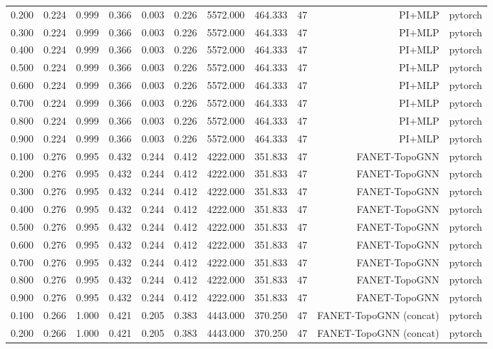 \begin{tabular}{lrrrrrrrrrr}
0.200 & 0.224 & 0.999 & 0.366 & 0.003 & 0.226 & 5572.000 & 464.333 & 47 & PI+MLP & pytorch \\
0.300 & 0.224 & 0.999 & 0.366 & 0.003 & 0.226 & 5572.000 & 464.333 & 47 & PI+MLP & pytorch \\
0.400 & 0.224 & 0.999 & 0.366 & 0.003 & 0.226 & 5572.000 & 464.333 & 47 & PI+MLP & pytorch \\
0.500 & 0.224 & 0.999 & 0.366 & 0.003 & 0.226 & 5572.000 & 464.333 & 47 & PI+MLP & pytorch \\
0.600 & 0.224 & 0.999 & 0.366 & 0.003 & 0.226 & 5572.000 & 464.333 & 47 & PI+MLP & pytorch \\
0.700 & 0.224 & 0.999 & 0.366 & 0.003 & 0.226 & 5572.000 & 464.333 & 47 & PI+MLP & pytorch \\
0.800 & 0.224 & 0.999 & 0.366 & 0.003 & 0.226 & 5572.000 & 464.333 & 47 & PI+MLP & pytorch \\
0.900 & 0.224 & 0.999 & 0.366 & 0.003 & 0.226 & 5572.000 & 464.333 & 47 & PI+MLP & pytorch \\
0.100 & 0.276 & 0.995 & 0.432 & 0.244 & 0.412 & 4222.000 & 351.833 & 47 & FANET-TopoGNN & pytorch \\
0.200 & 0.276 & 0.995 & 0.432 & 0.244 & 0.412 & 4222.000 & 351.833 & 47 & FANET-TopoGNN & pytorch \\
0.300 & 0.276 & 0.995 & 0.432 & 0.244 & 0.412 & 4222.000 & 351.833 & 47 & FANET-TopoGNN & pytorch \\
0.400 & 0.276 & 0.995 & 0.432 & 0.244 & 0.412 & 4222.000 & 351.833 & 47 & FANET-TopoGNN & pytorch \\
0.500 & 0.276 & 0.995 & 0.432 & 0.244 & 0.412 & 4222.000 & 351.833 & 47 & FANET-TopoGNN & pytorch \\
0.600 & 0.276 & 0.995 & 0.432 & 0.244 & 0.412 & 4222.000 & 351.833 & 47 & FANET-TopoGNN & pytorch \\
0.700 & 0.276 & 0.995 & 0.432 & 0.244 & 0.412 & 4222.000 & 351.833 & 47 & FANET-TopoGNN & pytorch \\
0.800 & 0.276 & 0.995 & 0.432 & 0.244 & 0.412 & 4222.000 & 351.833 & 47 & FANET-TopoGNN & pytorch \\
0.900 & 0.276 & 0.995 & 0.432 & 0.244 & 0.412 & 4222.000 & 351.833 & 47 & FANET-TopoGNN & pytorch \\
0.100 & 0.266 & 1.000 & 0.421 & 0.205 & 0.383 & 4443.000 & 370.250 & 47 & FANET-TopoGNN (concat) & pytorch \\
0.200 & 0.266 & 1.000 & 0.421 & 0.205 & 0.383 & 4443.000 & 370.250 & 47 & FANET-TopoGNN (concat) & pytorch \\

\end{tabular}
